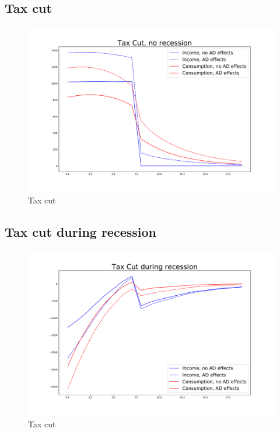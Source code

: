 \documentclass[]{article}
\begin{document}
\subsection{Tax cut}

\begin{figure} 
	\begin{centering}
		\includegraphics[width=\linewidth]{../tax_cut.pdf}
		\caption{Tax cut}
		\label{fig:taxcut}
	\end{centering}
\end{figure}


\subsection{Tax cut during recession}

\begin{figure} 
	\begin{centering}
		\includegraphics[width=\linewidth]{../taxcut_recession.pdf}
		\caption{Tax cut}
		\label{fig:taxcut}
	\end{centering}
\end{figure}
\end{document}
